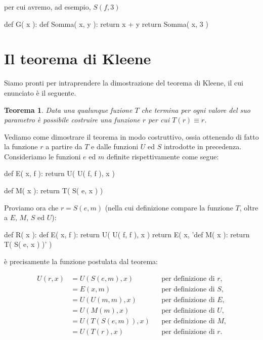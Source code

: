 \documentclass[a4paper]{article}
\newtheorem{teo}{Teorema}
\begin{document}
per cui avremo, ad esempio, $S( f, 3 )$

\begin{pycode}
def G( x ):
  def Somma( x, y ):
    return x + y
  return Somma( x, 3 )
\end{pycode}

\section*{Il teorema di Kleene}

Siamo pronti per intraprendere la dimostrazione del teorema di Kleene, il cui
enunciato è il seguente.

\begin{teo}
Data una qualunque fuzione $T$ che termina per ogni valore del suo parametro è
possibile costruire una funzione $r$ per cui $T(r) \equiv r$.
\end{teo}

Vediamo come dimostrare il teorema in modo costruttivo, ossia ottenendo di
fatto la funzione $r$ a partire da $T$ e dalle funzioni $U$ ed $S$ introdotte
in precedenza. Consideriamo le funzioni $e$ ed $m$ definite rispettivamente
come segue:

\begin{pycode}
def E( x, f ): return U( U( f, f ), x )
\end{pycode}

\begin{pycode}
def M( x ): return T( S( e, x ) )
\end{pycode}

Proviamo ora che $r = S( e, m )$ (nella cui definizione compare la funzione
$T$, oltre a $E$, $M$, $S$ ed $U$):

\begin{pycode}
def R( x ):
  def E( x, f ): return U( U( f, f ), x )
  return E( x, 'def M( x ): return T( S( e, x ) )' )
\end{pycode}

è precisamente la funzione postulata dal teorema:

\begin{align*}
  U( r, x ) &= U( S( e, m ), x ) && \text{per definizione di $r$,}\\
    &= E( x, m )                 && \text{per definizione di $S$,}\\
    &= U( U( m, m ), x )         && \text{per definizione di $E$,}\\
    &= U( M( m ), x )            && \text{per definizione di $U$,}\\
    &= U( T( S( e, m ) ), x )    && \text{per definizione di $M$,}\\
    &= U( T( r ), x )            && \text{per definizione di $r$.}
\end{align*}
\end{document}
